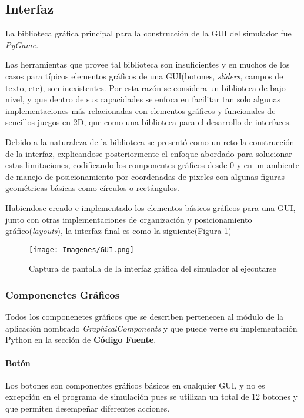 \documentclass[]{article}
\begin{document}
		\subsection{Interfaz}
			\justifying
			La biblioteca gráfica principal para la construcción de la GUI del simulador fue \textit{PyGame}.
			
			\justifying
			Las herramientas que provee tal biblioteca son insuficientes y en muchos de los casos para típicos elementos gráficos de una GUI(botones, \textit{sliders}, campos de texto, etc), son inexistentes. Por esta razón se considera un biblioteca de bajo nivel, y que dentro de sus capacidades se enfoca en facilitar tan solo algunas implementaciones más relacionadas con elementos gráficos y funcionales de sencillos juegos en 2D, que como una biblioteca para el desarrollo de interfaces.
			
			\justifying
			Debido a la naturaleza de la biblioteca se presentó como un reto la construcción de la interfaz, explicandose posteriormente el enfoque abordado para solucionar estas limitaciones, codificando los componentes gráficos desde 0 y en un ambiente de manejo de posicionamiento por coordenadas de pixeles con algunas figuras geométricas básicas como círculos o rectángulos.
			
			\justifying
			Habiendose creado e implementado los elementos básicos gráficos para una GUI, junto con otras implementaciones de organización y posicionamiento gráfico(\textit{layouts}), la interfaz final es como la siguiente(Figura \ref{GUI})
			
			\begin{figure}[!h]
				\centering
				\texttt{[image: Imagenes/GUI.png]}
				\label{GUI}
				\caption{Captura de pantalla de la interfaz gráfica del simulador al ejecutarse}
			\end{figure}
			
			\subsubsection{Componenetes Gráficos}
				\justifying
				Todos los componenetes gráficos que se describen pertenecen al módulo de la aplicación nombrado \textit{GraphicalComponents} y que puede verse su implementación Python en la sección de \textbf{Código Fuente}.
				
				\paragraph{Botón}
				Los botones son componentes gráficos básicos en cualquier GUI, y no es excepción en el programa de simulación pues se utilizan un total de 12 botones y que permiten desempeñar diferentes acciones.
				
\end{document}
